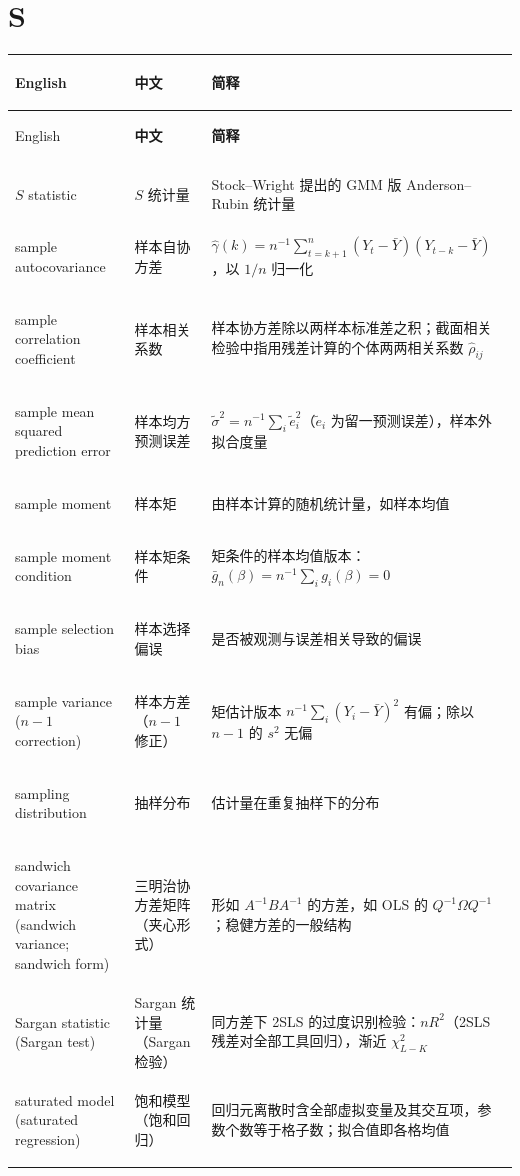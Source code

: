\section*{S}
\begin{longtable}{@{}>{\bfseries\boldmath\raggedright\arraybackslash}p{4.6cm}>{\raggedright\arraybackslash}p{3.2cm}>{\raggedright\arraybackslash}p{\dimexpr\textwidth-7.8cm-4\tabcolsep\relax}@{}}
\toprule
English & \textbf{中文} & \textbf{简释}\\
\midrule
\endfirsthead
\toprule
English & \textbf{中文} & \textbf{简释}\\
\midrule
\endhead
\midrule
\multicolumn{3}{r@{}}{\footnotesize\itshape （续下页）}\\
\endfoot
\bottomrule
\endlastfoot
$S$ statistic & $S$ 统计量 & Stock--Wright 提出的 GMM 版 Anderson--Rubin 统计量 \\
sample autocovariance & 样本自协方差 & $\hat\gamma(k)=n^{-1}\sum_{t=k+1}^n(Y_t-\bar Y)(Y_{t-k}-\bar Y)$，以 $1/n$ 归一化 \\
sample correlation coefficient & 样本相关系数 & 样本协方差除以两样本标准差之积；截面相关检验中指用残差计算的个体两两相关系数 $\hat\rho_{ij}$ \\
sample mean squared prediction error & 样本均方预测误差 & $\tilde\sigma^2=n^{-1}\sum_i\tilde e_i^2$（$\tilde e_i$ 为留一预测误差），样本外拟合度量 \\
sample moment & 样本矩 & 由样本计算的随机统计量，如样本均值 \\
sample moment condition & 样本矩条件 & 矩条件的样本均值版本：$\bar g_n(\beta)=n^{-1}\sum_ig_i(\beta)=0$ \\
sample selection bias & 样本选择偏误 & 是否被观测与误差相关导致的偏误 \\
sample variance ($n-1$ correction) & 样本方差（$n-1$ 修正） & 矩估计版本 $n^{-1}\sum_i(Y_i-\bar Y)^2$ 有偏；除以 $n-1$ 的 $s^2$ 无偏 \\
sampling distribution & 抽样分布 & 估计量在重复抽样下的分布 \\
sandwich covariance matrix (sandwich variance; sandwich form) & 三明治协方差矩阵（夹心形式） & 形如 $A^{-1}BA^{-1}$ 的方差，如 OLS 的 $Q^{-1}\Omega Q^{-1}$；稳健方差的一般结构 \\
Sargan statistic (Sargan test) & Sargan 统计量（Sargan 检验） & 同方差下 2SLS 的过度识别检验：$nR^2$（2SLS 残差对全部工具回归），渐近 $\chi^2_{L-K}$ \\
saturated model (saturated regression) & 饱和模型（饱和回归） & 回归元离散时含全部虚拟变量及其交互项，参数个数等于格子数；拟合值即各格均值 \\

\end{longtable}
